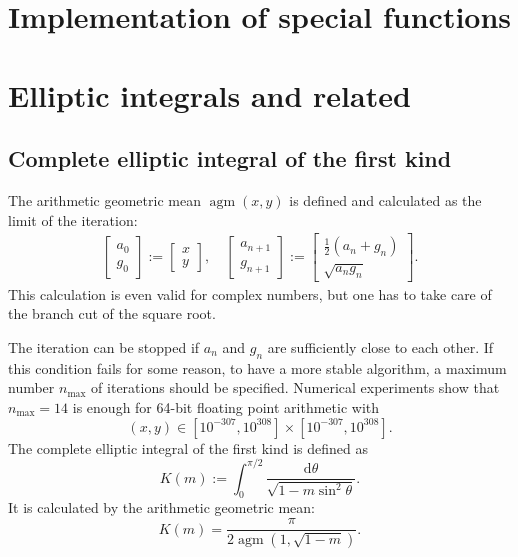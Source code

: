 \documentclass[a4paper,10pt,fleqn]{scrartcl}
\begin{document}
\thispagestyle{empty}

\section*{Implementation of special functions}

\tableofcontents

\section{Elliptic integrals and related}
\subsection{Complete elliptic integral of the first kind}
The arithmetic geometric mean $\operatorname{agm}(x,y)$
is defined and calculated as the limit of the iteration:
\begin{align}
\begin{bmatrix}
a_0\\
g_0
\end{bmatrix}
:=
\begin{bmatrix}
x\\
y
\end{bmatrix},
\quad
\begin{bmatrix}
a_{n+1}\\
g_{n+1}
\end{bmatrix}
:=
\begin{bmatrix}
\tfrac{1}{2}(a_n+g_n)\\
\sqrt{a_n g_n}
\end{bmatrix}.
\end{align}
This calculation is even valid for complex numbers, but one has to
take care of the branch cut of the square root.

The iteration can be stopped if $a_n$ and $g_n$ are sufficiently
close to each other. If this condition fails for some reason,
to have a more stable algorithm, a maximum number $n_{\mathrm{max}}$ of iterations
should be specified. Numerical experiments show that $n_{\mathrm{max}}=14$
is enough for 64-bit floating point arithmetic with
\begin{equation}
(x,y)\in [10^{-307},10^{308}]\times [10^{-307},10^{308}].
\end{equation}
The complete elliptic integral of the first kind is defined as
\begin{equation}
K(m) := \int_0^{\pi/2} \frac{\mathrm d\theta}{\sqrt{1-m\sin^2\theta}}.
\end{equation}
It is calculated by the arithmetic
geometric mean:
\begin{equation}
K(m) = \frac{\pi}{2\operatorname{agm}(1,\sqrt{1-m})}.
\end{equation}
\end{document}
